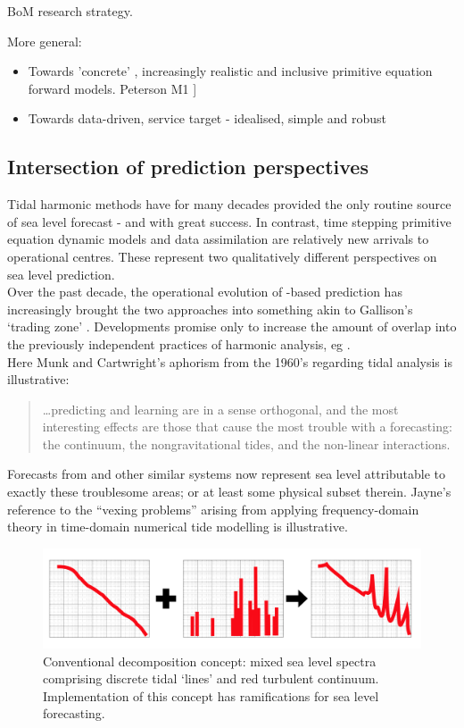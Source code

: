 BoM research strategy.


More general:

\begin{itemize}
  \item Towards 'concrete' , increasingly realistic and inclusive primitive equation forward models.
Peterson M1 ]\citep{Petersen:2012tr}
 \item Towards data-driven, service target - idealised, simple and robust 
\end{itemize}

\subsection{Intersection of prediction perspectives}
\label{S:two_perspectives}

Tidal harmonic methods have for many decades provided the only routine source of sea level forecast - and with great success.  
In contrast, time stepping primitive equation dynamic models and data assimilation are relatively new arrivals to operational centres.  
These represent two qualitatively different perspectives on sea level prediction.\\


Over the past decade, the operational evolution of \OGCM-based prediction has increasingly brought the two approaches into something akin to Gallison's `trading zone' \citep{Galison:1996uc}.
Developments promise only to increase the amount of overlap into the previously independent practices of harmonic analysis, eg \cite{Arbic:2010us}.\\
Here Munk and Cartwright's aphorism from the 1960's regarding tidal analysis is illustrative:
\begin{quote}
  \dots predicting and learning are in a sense orthogonal, and the most interesting effects are those that cause the most trouble with a forecasting: the continuum, the nongravitational tides, and the non-linear interactions.\citep{Munk:1966ts} 
\end{quote}
Forecasts from \BL{} and other similar systems now represent sea level attributable to exactly these troublesome areas; or at least some physical subset therein.
Jayne's reference to the ``vexing problems'' \citep[pp812]{Jayne:2001tr} arising from applying frequency-domain theory in time-domain numerical tide modelling is illustrative.

\begin{figure}[h]\centering
  \includegraphics[width=120mm]{figures/diagrams/spectra_cartoon_1.png}
  \caption{Conventional decomposition concept: mixed sea level spectra comprising discrete tidal `lines' and red turbulent continuum.  Implementation of this concept has ramifications for sea level forecasting.}
  \label{fig:SPECTRA_CARTOON}
\end{figure}

